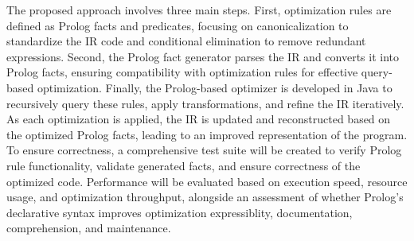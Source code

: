 The proposed approach involves three main steps. First, optimization rules are defined as Prolog facts and predicates, focusing on canonicalization to standardize the IR code and conditional elimination to remove redundant expressions. Second, the Prolog fact generator parses the IR and converts it into Prolog facts, ensuring compatibility with optimization rules for effective query-based optimization. Finally, the Prolog-based optimizer is developed in Java to recursively query these rules, apply transformations, and refine the IR iteratively. As each optimization is applied, the IR is updated and reconstructed based on the optimized Prolog facts, leading to an improved representation of the program. To ensure correctness, a comprehensive test suite will be created to verify Prolog rule functionality, validate generated facts, and ensure correctness of the optimized code. Performance will be evaluated based on execution speed, resource usage, and optimization throughput, alongside an assessment of whether Prolog’s declarative syntax improves optimization expressiblity, documentation, comprehension, and maintenance.
